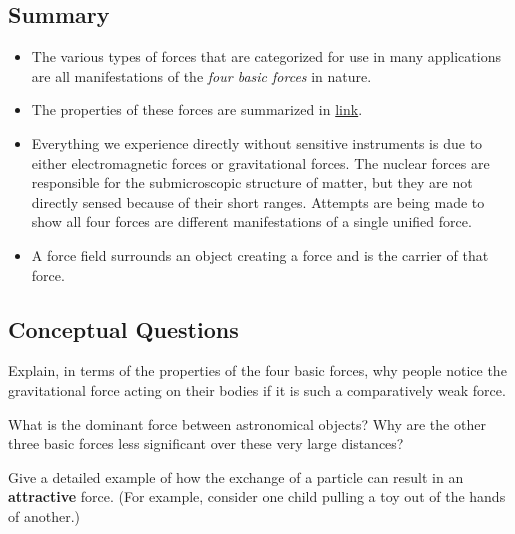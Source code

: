\documentclass[
]{book}
\providecommand{\tightlist}{%
  \setlength{\itemsep}{0pt}\setlength{\parskip}{0pt}}
\begin{document}
\hypertarget{fs-id1993313-summary}{}
\hypertarget{summary-6}{%
\subsection{Summary}\label{summary-6}}

\begin{itemize}
\tightlist
\item
  \protect\hypertarget{import-auto-id2055006}{}{The various types of forces that are categorized for use in many
  applications are all manifestations of the \emph{four basic forces} in
  nature.}
\item
  \protect\hypertarget{import-auto-id1355832}{}{The properties of these forces are summarized in
  \protect\hyperlink{import-auto-id1588108}{link}.}
\item
  \protect\hypertarget{import-auto-id1381444}{}{Everything we experience directly without sensitive instruments is
  due to either electromagnetic forces or gravitational forces. The
  nuclear forces are responsible for the submicroscopic structure of
  matter, but they are not directly sensed because of their short
  ranges. Attempts are being made to show all four forces are
  different manifestations of a single unified
  force.}
\item
  \protect\hypertarget{import-auto-id3191620}{}{A force field surrounds an object creating a force and is the
  carrier of that force.}
\end{itemize}

\hypertarget{fs-id3199417}{}
\hypertarget{conceptual-questions-17}{%
\subsection{Conceptual Questions}\label{conceptual-questions-17}}

\hypertarget{fs-id1397916}{}
\leavevmode{}%
Explain, in terms of the properties of the four basic forces, why people
notice the gravitational force acting on their bodies if it is such a
comparatively weak force.

\hypertarget{fs-id1402987}{}
\leavevmode{}%
What is the dominant force between astronomical objects? Why are the
other three basic forces less significant over these very large
distances?

\hypertarget{fs-id1038237}{}
\leavevmode{}%
Give a detailed example of how the exchange of a particle can result in
an \textbf{attractive} force. (For example, consider one child pulling a toy
out of the hands of another.)
\end{document}

